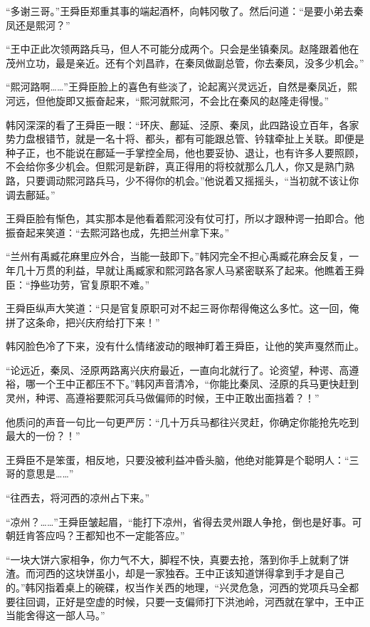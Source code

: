 “多谢三哥。”王舜臣郑重其事的端起酒杯，向韩冈敬了。然后问道：“是要小弟去秦凤还是熙河？”

“王中正此次领两路兵马，但人不可能分成两个。只会是坐镇秦凤。赵隆跟着他在茂州立功，最是亲近。还有个刘昌祚，在秦凤做副总管，你去秦凤，没多少机会。”

“熙河路啊……”王舜臣脸上的喜色有些淡了，论起离兴灵远近，自然是秦凤近，熙河远，但他旋即又振奋起来，“熙河就熙河，不会比在秦风的赵隆走得慢。”

韩冈深深的看了王舜臣一眼：“环庆、鄜延、泾原、秦凤，此四路设立百年，各家势力盘根错节，就是一名十将、都头，都有可能跟总管、钤辖牵扯上关联。即便是种子正，也不能说在鄜延一手掌控全局，他也要妥协、退让，也有许多人要照顾，不会给你多少机会。但熙河是新辟，真正得用的将校就那么几人，你又是熟门熟路，只要调动熙河路兵马，少不得你的机会。”他说着又摇摇头，“当初就不该让你调去鄜延。”

王舜臣脸有惭色，其实那本是他看着熙河没有仗可打，所以才跟种谔一拍即合。他振奋起来笑道：“去熙河路也成，先把兰州拿下来。”

“兰州有禹臧花麻里应外合，当能一鼓即下。”韩冈完全不担心禹臧花麻会反复，一年几十万贯的利益，早就让禹臧家和熙河路各家人马紧密联系了起来。他瞧着王舜臣：“挣些功劳，官复原职不难。”

王舜臣纵声大笑道：“只是官复原职可对不起三哥你帮得俺这么多忙。这一回，俺拼了这条命，把兴庆府给打下来！”

韩冈脸色冷了下来，没有什么情绪波动的眼神盯着王舜臣，让他的笑声戛然而止。

“论远近，秦凤、泾原两路离兴庆府最近，一直向北就行了。论资望，种谔、高遵裕，哪一个王中正都压不下。”韩冈声音清冷，“你能比秦凤、泾原的兵马更快赶到灵州，种谔、高遵裕要熙河兵马做偏师的时候，王中正敢出面挡着？！”

他质问的声音一句比一句更严厉：“几十万兵马都往兴灵赶，你确定你能抢先吃到最大的一份？！”

王舜臣不是笨蛋，相反地，只要没被利益冲昏头脑，他绝对能算是个聪明人：“三哥的意思是……”

“往西去，将河西的凉州占下来。”

“凉州？……”王舜臣皱起眉，“能打下凉州，省得去灵州跟人争抢，倒也是好事。可朝廷肯答应吗？王都知也不一定能答应。”

“一块大饼六家相争，你力气不大，脚程不快，真要去抢，落到你手上就剩了饼渣。而河西的这块饼虽小，却是一家独吞。王中正该知道饼得拿到手才是自己的。”韩冈指着桌上的碗碟，权当作关西的地理，“兴灵危急，河西的党项兵马全都要往回调，正好是空虚的时候，只要一支偏师打下洪池岭，河西就在掌中，王中正当能舍得这一部人马。”

